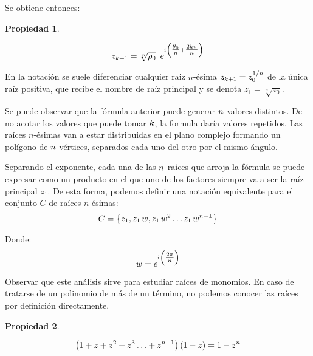 \documentclass[a5paper,12pt,twoside]{book}
\newtheorem{prop}{{Propiedad}}[chapter]
\begin{document}
Se obtiene entonces:

\begin{mdframed}[style=MyFrame1]
    \begin{prop}
    \end{prop}
    \begin{equation*}
        z_{k+1} = \sqrt[n]{\rho_0} \enspace e^{\mathrm{i}\mkern1mu \left( \tfrac{\theta_0}{n} + \tfrac{2 k \pi}{n} \right)}
    \end{equation*}
\end{mdframed}

En la notación se suele diferenciar cualquier raiz $n$-ésima $z_{k+1} = z_0^{1/n}$ de la única raíz positiva, que recibe el nombre de raíz principal y se denota $z_1=\sqrt[n]{z_0}$.

Se puede observar que la fórmula anterior puede generar $n$ valores distintos. De no acotar los valores que puede tomar $k$, la formula daría valores repetidos. Las raíces $n$-ésimas van a estar distribuidas en el plano complejo formando un polígono de $n$ vértices, separados cada uno del otro por el mismo ángulo.

Separando el exponente, cada una de las $n$ raíces que arroja la fórmula se puede expresar como un producto en el que uno de los factores siempre va a ser la raíz principal $z_1$. De esta forma, podemos definir una notación equivalente para el conjunto $C$ de raíces $n$-ésimas:
\begin{equation*}
    C = { \left\{ {z_1 , z_1 \, w , z_1 \, w^2 \ldots z_1 \, w^{n-1}} \right\} }
\end{equation*}

Donde:
\begin{equation*}
    w = e^{\mathrm{i}\mkern1mu \left( \tfrac{2 \pi}{n} \right)}
\end{equation*}

Observar que este análisis sirve para estudiar raíces de monomios. En caso de tratarse de un polinomio de más de un término, no podemos conocer las raíces por definición directamente.

\begin{mdframed}[style=MyFrame1]
    \begin{prop}
    \end{prop}
    \begin{equation*}
        \left( 1 + z + z^2 + z^3 \ldots + z^{n-1} \right) \left( 1 - z \right) = 1 - z^n
    \end{equation*}
\end{mdframed}
\end{document}

